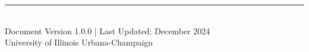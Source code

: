 \documentclass[11pt,a4paper]{article}
\begin{document}

\vfill
\begin{center}
\rule{0.5\textwidth}{0.4pt}\\[0.5em]
{\small Document Version 1.0.0 | Last Updated: December 2024}\\
{\small University of Illinois Urbana-Champaign}
\end{center}
\end{document}
